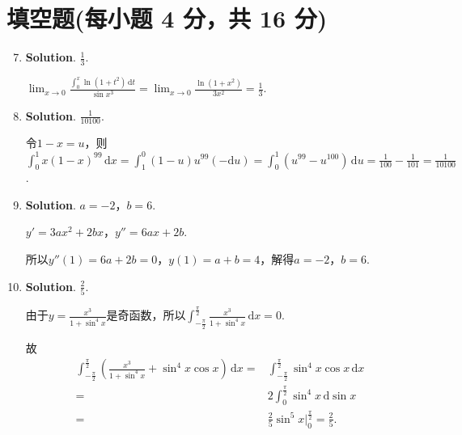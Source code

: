 \documentclass[../Main.tex]{subfiles}
\begin{document}
\section{填空题(每小题 4 分，共 16 分)}
\begin{enumerate}
    \setcounter{enumi}{6}
    \item \textbf{Solution}. $\frac{1}{3}$.

          $\lim_{x\to0}\frac{\displaystyle\int_{0}^{x}\ln(1+t^{2})\,\mathrm{d}t}{\sin
                  x^{3}}=\lim_{x\to0}\frac{\ln(1+x^{2})}{3x^{2}}=\frac{1}{3}$.

    \item \textbf{Solution}. $\frac{1}{10100}$.

          令$1-x=u$，则$\int_{0}^{1}x(1-x)^{99}\,\mathrm{d}x=\int_{1}^{0}(1-u)u^{99}(-\mathrm{d}
              u)=\int_{0}^{1}(u^{99}-u^{100})\,\mathrm{d}u=\frac{1}{100}-\frac{1}{101}=\frac{1}{10100}$.

    \item \textbf{Solution}. $a=-2$，$b=6$.

          $y'=3ax^{2}+2bx$，$y''=6ax+2b$.

          所以$y''(1)=6a+2b=0$，$y(1)=a+b=4$，解得$a=-2$，$b=6$.

    \item \textbf{Solution}. $\frac{2}{5}$.

          由于$y=\frac{x^{3}}{1+\sin^{4} x}$是奇函数，所以$\int_{-\frac{\pi}{2}}^{\frac{\pi}{2}}
              \frac{x^{3}}{1+\sin^{4} x}\,\mathrm{d}x=0$.

          故
          \[
              \begin{aligned}
                  \int_{-\frac{\pi}{2}}^{\frac{\pi}{2}}\left(\frac{x^3}{1+\sin^4 x}+\sin^{4} x\cos x\right)\,\mathrm{d}x = & \int_{-\frac{\pi}{2}}^{\frac{\pi}{2}}\sin^{4} x\cos x\,\mathrm{d}x \\
                  =                                                                                                        & 2\int_{0}^{\frac{\pi}{2}}\sin^{4} x\,\mathrm{d}\sin x              \\
                  =                                                                                                        & \frac{2}{5}\sin^{5} x\bigg|_{0}^{\frac{\pi}{2}}= \frac{2}{5}.
              \end{aligned}
          \]
\end{enumerate}
\end{document}
